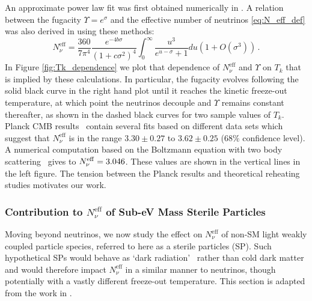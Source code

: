 An approximate power law fit was first obtained numerically in \cite{Birrell:2013gpa}. A relation between   the fugacity $\Upsilon=e^\sigma$ and the effective number of neutrinos \eqref{eq:N_eff_def} was also derived in \cite{Birrell:2012gg} using these methods:
\begin{equation}\label{N_nu_approx}
N^{\mathrm{eff}}_\nu=\frac{360}{7\pi^4}\frac{e^{-4b\sigma}}{(1+c\sigma^2)^4}\int_0^\infty \frac{u^3}{e^{u-\sigma}+1}du\left(1+O(\sigma^3)\right)\,.
\end{equation}
 In Figure \ref{fig:Tk_dependence} we plot that dependence of $N^{\mathrm{eff}}_\nu$ and $\Upsilon$  on $T_k$ that is implied by these calculations.  In particular, the fugacity evolves following the solid black curve in the right hand plot until it reaches the kinetic freeze-out temperature, at which point the neutrinos decouple and $\Upsilon$ remains constant thereafter, as shown in the dashed black curves for two sample values of $T_k$. Planck CMB results~\cite{Planck:2013pxb}  contain several fits based on different data sets which suggest that $N^{\mathrm{eff}}_\nu$ is in the range $3.30\pm 0.27$ to $3.62\pm0.25$ ($68\%$ confidence level). A numerical computation based on the Boltzmann equation with two body scattering~\cite{Mangano:2005cc} gives to $N_{\nu}^{\rm eff}=3.046$. These values are shown in the vertical lines in the left figure. The tension between the Planck results and theoretical reheating studies motivates our work.





\subsubsection{Contribution to $N^{\text{eff}}_{\nu}$ of  Sub-eV  Mass Sterile Particles}\label{sec:Neff_QGP}

Moving beyond neutrinos, we now study the effect on $N_\nu^{\text{eff}}$ of non-SM light weakly coupled  particle species, referred to here as a sterile particles (SP). Such hypothetical SPs would behave as `dark radiation'~\cite{Steigman:2013yua} rather than cold dark matter and would therefore impact $N_\nu^{\text{eff}}$ in a similar manner to neutrinos, though potentially with a vastly different freeze-out temperature.  This section is adapted from the work in \cite{Birrell:2014cja}.


